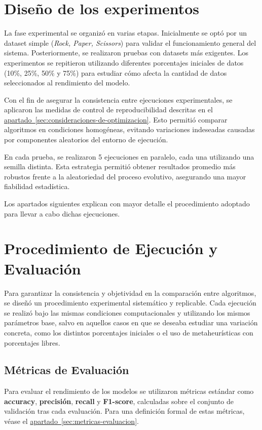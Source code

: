 \section{Diseño de los experimentos}\label{sec:diseño-de-los-experimentos}
La fase experimental se organizó en varias etapas.
Inicialmente se optó por un dataset simple (\textit{Rock, Paper, Scissors}) para validar el funcionamiento general del sistema.
Posteriormente, se realizaron pruebas con datasets más exigentes.
Los experimentos se repitieron utilizando diferentes porcentajes iniciales de datos (10\%, 25\%, 50\% y 75\%)
para estudiar cómo afecta la cantidad de datos seleccionados al rendimiento del modelo.

Con el fin de asegurar la consistencia entre ejecuciones experimentales, se aplicaron las medidas de control de reproducibilidad
descritas en el \hyperref[sec:consideraciones-de-optimizacion]{apartado~\ref*{sec:consideraciones-de-optimizacion}}.
Esto permitió comparar algoritmos en condiciones homogéneas, evitando variaciones indeseadas causadas por componentes aleatorios del entorno de ejecución.

En cada prueba, se realizaron 5 ejecuciones en paralelo, cada una utilizando una semilla distinta.
Esta estrategia permitió obtener resultados promedio más robustos frente a la aleatoriedad del proceso evolutivo, asegurando una mayor fiabilidad estadística.

Los apartados siguientes explican con mayor detalle el procedimiento adoptado para llevar a cabo dichas ejecuciones.


\section{Procedimiento de Ejecución y Evaluación}\label{sec:procedimiento-de-ejecucion-y-evaluacion}

Para garantizar la consistencia y objetividad en la comparación entre algoritmos, se diseñó un procedimiento experimental sistemático y replicable.
Cada ejecución se realizó bajo las mismas condiciones computacionales y utilizando los mismos parámetros base,
salvo en aquellos casos en que se deseaba estudiar una variación concreta, como los distintos porcentajes iniciales o el uso de metaheurísticas con porcentajes libres.


\subsection{Métricas de Evaluación}\label{sec:metricas-de-evaluacion}
Para evaluar el rendimiento de los modelos se utilizaron métricas estándar como \textbf{accuracy}, \textbf{precisión}, \textbf{recall} y \textbf{F1-score},
calculadas sobre el conjunto de validación tras cada evaluación.
Para una definición formal de estas métricas, véase el \hyperref[sec:metricas-evaluacion]{apartado~\ref*{sec:metricas-evaluacion}}.

